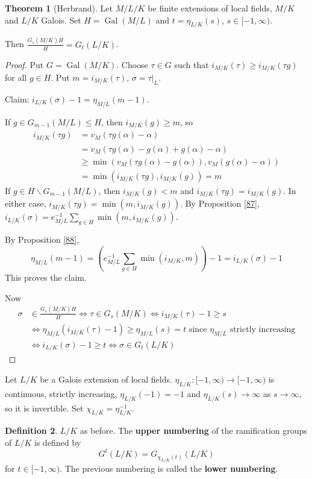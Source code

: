 \documentclass[a4paper]{article}
\theoremstyle{definition}
\newtheorem{definition}{Definition}
\theoremstyle{default}
\newtheorem{theorem}[definition]{Theorem}
\theoremstyle{remark}
\DeclareMathOperator{\Gal}{Gal}
\begin{document}
\begin{theorem}[Herbrand]
	Let $M/L/K$ be finite extensions of local fields,
	$M/K$ and $L/K$ Galois.
	Set $H=\Gal(M/L)$ and $t = \eta_{L/K}(s)$, $s \in [-1, \infty)$.
	
	Then $\frac{G_s(M/K)H}{H} = G_t(L/K)$.
	\label{89}
\end{theorem}
\begin{proof}
	Put $G=\Gal(M/K)$.
	Choose $\tau \in G$ such that $i_{M/K}(\tau) \geq i_{M/K}(\tau g)$ for all $g \in H$.
	Put $m = i_{M/K}(\tau)$, $\sigma = \tau|_L$.
	
	Claim: $i_{L/K}(\sigma) - 1 = \eta_{M/L}(m-1)$.
	
	If $g \in G_{m-1}(M/L) \leq H$, then $i_{M/K}(g) \geq m$, so
	\begin{align*}
		i_{M/K}(\tau g) &= v_M(\tau g(\alpha) - \alpha) \\
		&= v_M(\tau g(\alpha) - g(\alpha) + g(\alpha) - \alpha) \\
		&\geq \min (v_M(\tau g(\alpha) - g(\alpha)), v_M(g(\alpha) - \alpha)) \\
		&= \min(i_{M/K}(\tau g), i_{M/K}(g)) = m
	\end{align*}
	If $g \in H \backslash G_{m-1}(M/L)$,
	then $i_{M/K}(g) < m$ and $i_{M/K}(\tau g) = i_{M/K}(g)$.
	In either case, $i_{M/K}(\tau g) = \min(m, i_{M/K}(g))$.
	By Proposition \ref{87}, $i_{L/K}(\sigma) = e_{M/L}^{-1} \sum_{g \in H}\min(m, i_{M/K}(g))$.
	
	By Proposition \ref{88},
	$$\eta_{M/L}(m-1) = \left(e_{M/L}^{-1} \sum_{g \in H} \min(i_{M/K}, m)\right) - 1 = i_{L/K}(\sigma) - 1$$
	This proves the claim.
	
	Now
	\begin{align*}
		\sigma &\in \frac{G_s(M/K)H}{H} \iff \tau \in G_s(M/K) \iff i_{M/K}(\tau) - 1 \geq s \\
		&\iff \eta_{M/L}(i_{M/K}(\tau) - 1) \geq \eta_{M/L}(s) = t \text{ since $\eta_{M/L}$ strictly increasing} \\
		&\iff i_{L/K}(\sigma) - 1 \geq t \iff \sigma \in G_t(L/K)
	\end{align*}
\end{proof}

Let $L/K$ be a Galois extension of local fields.
$\eta_{L/K}: [-1, \infty) \to [-1, \infty)$ is continuous, strictly increasing,
$\eta_{L/K}(-1) = -1$ and $\eta_{L/K}(s) \to \infty$ as $s \to \infty$,
so it is invertible.
Set $\chi_{L/K} = \eta_{L/K}^{-1}$.

\begin{definition}
	$L/K$ as before.
	The \textbf{upper numbering} of the ramification groups of $L/K$ is defined by
	$$G^t(L/K) = G_{\chi_{L/K}(t)}(L/K)$$
	for $t \in [-1, \infty)$.
	The previous numbering is called the \textbf{lower numbering}.
\end{definition}
\end{document}
